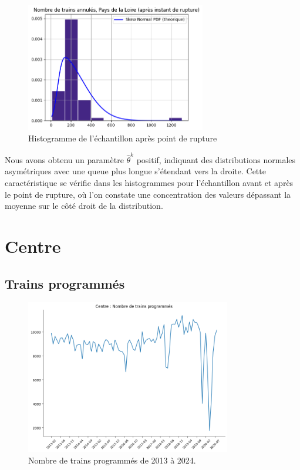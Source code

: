 {\begin{figure}[H]
  \centering
  \includegraphics[width=0.7\textwidth]{image/PL-FIG11.png}
  \caption{Histogramme de l'échantillon après point de rupture}
\end{figure}

Nous avons obtenu un paramètre $\hat{\theta}^k$ positif, indiquant des distributions normales asymétriques avec une queue plus longue s'étendant vers la droite. Cette caractéristique se vérifie dans les histogrammes pour l'échantillon avant et après le point de rupture, où l'on constate une concentration des valeurs dépassant la moyenne sur le côté droit de la distribution. 

\section{Centre}

\subsection{Trains programmés}

\begin{figure}[H]
\centering
\includegraphics[width=0.8\textwidth]{image/Cn-FIG1.png} 
\caption{Nombre de trains programmés de 2013 à 2024.}
\label{fig:trains_programmes}
\end{figure}

}
